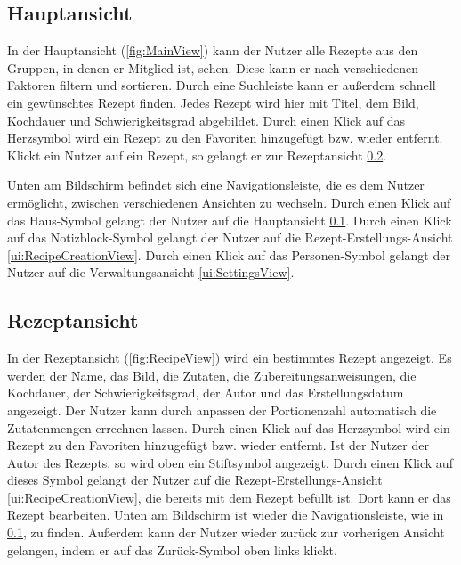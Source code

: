 \documentclass[parskip=full]{scrartcl}
\begin{document}
\subsection{Hauptansicht}
\label{ui:MainView}
In der Hauptansicht (\autoref{fig:MainView}) kann der Nutzer alle Rezepte aus den Gruppen, in denen er Mitglied ist, sehen. Diese kann er nach verschiedenen Faktoren filtern und sortieren. Durch eine Suchleiste kann er außerdem schnell ein gewünschtes Rezept finden. Jedes Rezept wird hier mit Titel, dem Bild, Kochdauer und Schwierigkeitsgrad abgebildet. Durch einen Klick auf das Herzsymbol wird ein Rezept zu den Favoriten hinzugefügt bzw. wieder entfernt. Klickt ein Nutzer auf ein Rezept, so gelangt er zur Rezeptansicht \ref{ui:RecipeView}.

Unten am Bildschirm befindet sich eine Navigationsleiste, die es dem Nutzer ermöglicht, zwischen verschiedenen Ansichten zu wechseln. Durch einen Klick auf das Haus-Symbol gelangt der Nutzer auf die Hauptansicht \ref{ui:MainView}. Durch einen Klick auf das Notizblock-Symbol gelangt der Nutzer auf die Rezept-Erstellungs-Ansicht \ref{ui:RecipeCreationView}. Durch einen Klick auf das Personen-Symbol gelangt der Nutzer auf die Verwaltungsansicht \ref{ui:SettingsView}.

\subsection{Rezeptansicht}
\label{ui:RecipeView}

In der Rezeptansicht (\autoref{fig:RecipeView}) wird ein bestimmtes Rezept angezeigt. Es werden der Name, das Bild, die Zutaten, die Zubereitungsanweisungen, die Kochdauer, der Schwierigkeitsgrad, der Autor und das Erstellungsdatum angezeigt. Der Nutzer kann durch anpassen der Portionenzahl automatisch die Zutatenmengen errechnen lassen. Durch einen Klick auf das Herzsymbol wird ein Rezept zu den Favoriten hinzugefügt bzw. wieder entfernt. Ist der Nutzer der Autor des Rezepts, so wird oben ein Stiftsymbol angezeigt. Durch einen Klick auf dieses Symbol gelangt der Nutzer auf die Rezept-Erstellungs-Ansicht \ref{ui:RecipeCreationView}, die bereits mit dem Rezept befüllt ist. Dort kann er das Rezept bearbeiten. Unten am Bildschirm ist wieder die Navigationsleiste, wie in \ref{ui:MainView}, zu finden. Außerdem kann der Nutzer wieder zurück zur vorherigen Ansicht gelangen, indem er auf das Zurück-Symbol oben links klickt.
\end{document}
